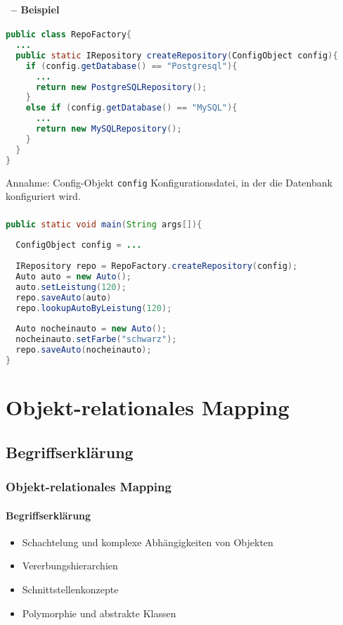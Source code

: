 \begin{frame}[fragile]\frametitle{\insertsection}
\framesubtitle{\insertsubsection\ -- Beispiel}
\begin{lstlisting}[xleftmargin=3ex, showstringspaces=false, language=Java]
public class RepoFactory{
  ...
  public static IRepository createRepository(ConfigObject config){
    if (config.getDatabase() == "Postgresql"){
      ...
      return new PostgreSQLRepository(); 
    } 
    else if (config.getDatabase() == "MySQL"){
      ...
      return new MySQLRepository(); 
    }
  }
}
\end{lstlisting}
Annahme: Config-Objekt \texttt{config} Konfigurationsdatei, in der die Datenbank konfiguriert wird.
\end{frame}

\begin{frame}[fragile]\frametitle{\insertsection}
\framesubtitle{\insertsubsection}
\begin{lstlisting}[xleftmargin=3ex, showstringspaces=false, language=Java]
public static void main(String args[]){
  
  ConfigObject config = ...
  
  IRepository repo = RepoFactory.createRepository(config); 
  Auto auto = new Auto();
  auto.setLeistung(120);
  repo.saveAuto(auto)
  repo.lookupAutoByLeistung(120);
  
  Auto nocheinauto = new Auto(); 
  nocheinauto.setFarbe("schwarz");
  repo.saveAuto(nocheinauto);   
}
\end{lstlisting}
\end{frame}

\section{Objekt-relationales Mapping}
\subsection{Begriffserklärung}

\begin{frame}[t]\frametitle{Objekt-relationales Mapping}
    \framesubtitle{Begriffserklärung}
    \begin{itemize}
    	\item Schachtelung und komplexe Abhängigkeiten von Objekten
    	\item Vererbungshierarchien 
    	\item Schnittstellenkonzepte
    	\item Polymorphie und abstrakte Klassen
    \end{itemize}
\end{frame}

